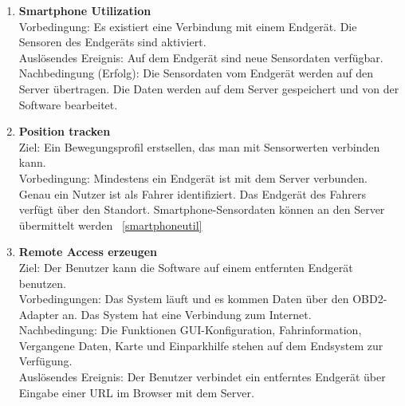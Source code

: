 \documentclass[pflichtenheft.tex]{subfiles}
\begin{document}
\begin{enumerate}
		\renewcommand{\theenumi}{/FA\ifnum \value{enumi}<10 0\fi\arabic{enumi}0W/}
		\renewcommand{\labelenumi}{\theenumi}
		\renewcommand{\theenumii}{\arabic{enumii}}
		\renewcommand{\labelenumii}{/FA\ifnum \value{enumi}<10 0\fi\arabic{enumi}\arabic{enumii}W/}

		\item{\textbf{Smartphone Utilization}} \label{smartphoneutil} \\
		Vorbedingung: Es existiert eine Verbindung mit einem Endgerät. Die Sensoren des Endgeräts sind aktiviert.\\Auslösendes Ereignis: Auf dem Endgerät sind neue Sensordaten verfügbar. \\ Nachbedingung (Erfolg): Die Sensordaten vom Endgerät werden auf den Server übertragen. Die Daten werden auf dem Server gespeichert und von der Software bearbeitet.

		\item{\textbf{Position tracken}}\\
		Ziel: Ein Bewegungsprofil erstsellen, das man mit Sensorwerten verbinden kann.\\
		Vorbedingung: Mindestens ein Endgerät ist mit dem Server verbunden. Genau ein Nutzer ist als Fahrer identifiziert. Das Endgerät des Fahrers verfügt über den Standort. Smartphone-Sensordaten können an den Server übermittelt werden ~\ref{smartphoneutil}

		\renewcommand{\theenumi}{/FA\ifnum \value{enumi}<10 0\fi\arabic{enumi}0/}
		\renewcommand{\labelenumi}{\theenumi}
		\renewcommand{\theenumii}{\arabic{enumii}}
		\renewcommand{\labelenumii}{/FA\ifnum \value{enumi}<10 0\fi\arabic{enumi}\arabic{enumii}/}
		
		\item{\textbf{Remote Access erzeugen}} \label{remote} \\ Ziel: Der Benutzer kann die Software auf einem entfernten Endgerät benutzen.\\ Vorbedingungen: Das System läuft und es kommen Daten über den OBD2-Adapter an. Das System hat eine Verbindung zum Internet.\\ Nachbedingung: Die Funktionen GUI-Konfiguration, Fahrinformation, Vergangene Daten, Karte und Einparkhilfe stehen auf dem Endsystem zur Verfügung.\\ Auslösendes Ereignis: Der Benutzer verbindet ein entferntes Endgerät über Eingabe einer URL im Browser mit dem Server.
		\setcounter{enumTemp}{\value{enumi}}
	\end{enumerate} 
\end{document}
